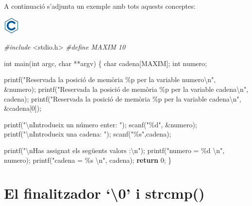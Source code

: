 \documentclass[
]{book}
\newenvironment{Shaded}{\begin{snugshade}}{\end{snugshade}}
\newcommand{\ControlFlowTok}[1]{\textcolor[rgb]{0.13,0.29,0.53}{\textbf{#1}}}
\newcommand{\DataTypeTok}[1]{\textcolor[rgb]{0.13,0.29,0.53}{#1}}
\newcommand{\DecValTok}[1]{\textcolor[rgb]{0.00,0.00,0.81}{#1}}
\newcommand{\ImportTok}[1]{#1}
\newcommand{\NormalTok}[1]{#1}
\newcommand{\PreprocessorTok}[1]{\textcolor[rgb]{0.56,0.35,0.01}{\textit{#1}}}
\newcommand{\SpecialCharTok}[1]{\textcolor[rgb]{0.00,0.00,0.00}{#1}}
\newcommand{\StringTok}[1]{\textcolor[rgb]{0.31,0.60,0.02}{#1}}
\begin{document}
A continuació s'adjunta un exemple amb tots aquests conceptes:

\includegraphics{./img/c.png}

\begin{Shaded}
\begin{Highlighting}[]
\PreprocessorTok{\#include }\ImportTok{\textless{}stdio.h\textgreater{}}
\PreprocessorTok{\#define MAXIM 10}

\DataTypeTok{int}\NormalTok{ main(}\DataTypeTok{int}\NormalTok{ argc, }\DataTypeTok{char}\NormalTok{ **argv) \{}
    \DataTypeTok{char}\NormalTok{ cadena[MAXIM];}
    \DataTypeTok{int}\NormalTok{ numero;}

\NormalTok{    printf(}\StringTok{"Reservada la posició de memòria \%p per la variable numero}\SpecialCharTok{\textbackslash{}n}\StringTok{"}\NormalTok{, \&numero);}
\NormalTok{    printf(}\StringTok{"Reservada la posició de memòria \%p per la variable cadena}\SpecialCharTok{\textbackslash{}n}\StringTok{"}\NormalTok{, cadena);}
\NormalTok{    printf(}\StringTok{"Reservada la posició de memòria \%p per la variable cadena}\SpecialCharTok{\textbackslash{}n}\StringTok{"}\NormalTok{, \&cadena[}\DecValTok{0}\NormalTok{]);}

\NormalTok{    printf(}\StringTok{"}\SpecialCharTok{\textbackslash{}n}\StringTok{Introdueix un número enter: "}\NormalTok{);}
\NormalTok{    scanf(}\StringTok{"\%d"}\NormalTok{, \&numero);}
\NormalTok{    printf(}\StringTok{"}\SpecialCharTok{\textbackslash{}n}\StringTok{Introdueix una cadena: "}\NormalTok{);}
\NormalTok{    scanf(}\StringTok{"\%s"}\NormalTok{,cadena);}

\NormalTok{    printf(}\StringTok{"}\SpecialCharTok{\textbackslash{}n}\StringTok{Has assignat els següents valors :}\SpecialCharTok{\textbackslash{}n}\StringTok{"}\NormalTok{);}
\NormalTok{    printf(}\StringTok{"numero = \%d }\SpecialCharTok{\textbackslash{}n}\StringTok{"}\NormalTok{, numero);}
\NormalTok{    printf(}\StringTok{"cadena = \%s }\SpecialCharTok{\textbackslash{}n}\StringTok{"}\NormalTok{, cadena);}
    \ControlFlowTok{return} \DecValTok{0}\NormalTok{;}
\NormalTok{\}}
\end{Highlighting}
\end{Shaded}

\hypertarget{el-finalitzador-0-i-strcmp}{%
\section{El finalitzador `\textbackslash0' i strcmp()}\label{el-finalitzador-0-i-strcmp}}
\end{document}
